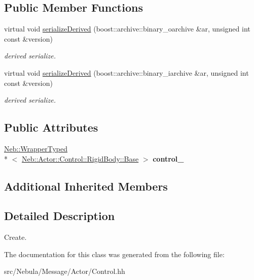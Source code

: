 \subsection*{Public Member Functions}
\begin{DoxyCompactItemize}
\item 
\hypertarget{classNeb_1_1Message_1_1Actor_1_1Control_1_1RigidBody_1_1Create_aa390bc059f2eea71aed8d255faf23509}{virtual void \hyperlink{classNeb_1_1Message_1_1Actor_1_1Control_1_1RigidBody_1_1Create_aa390bc059f2eea71aed8d255faf23509}{serialize\-Derived} (boost\-::archive\-::binary\-\_\-oarchive \&ar, unsigned int const \&version)}\label{classNeb_1_1Message_1_1Actor_1_1Control_1_1RigidBody_1_1Create_aa390bc059f2eea71aed8d255faf23509}

\begin{DoxyCompactList}\small\item\em derived serialize. \end{DoxyCompactList}\item 
\hypertarget{classNeb_1_1Message_1_1Actor_1_1Control_1_1RigidBody_1_1Create_a6784429360fa42e6146a696d7e164731}{virtual void \hyperlink{classNeb_1_1Message_1_1Actor_1_1Control_1_1RigidBody_1_1Create_a6784429360fa42e6146a696d7e164731}{serialize\-Derived} (boost\-::archive\-::binary\-\_\-iarchive \&ar, unsigned int const \&version)}\label{classNeb_1_1Message_1_1Actor_1_1Control_1_1RigidBody_1_1Create_a6784429360fa42e6146a696d7e164731}

\begin{DoxyCompactList}\small\item\em derived serialize. \end{DoxyCompactList}\end{DoxyCompactItemize}
\subsection*{Public Attributes}
\begin{DoxyCompactItemize}
\item 
\hypertarget{classNeb_1_1Message_1_1Actor_1_1Control_1_1RigidBody_1_1Create_ad5dad4e62045e21146c253792c0c36ee}{\hyperlink{classNeb_1_1WrapperTyped}{Neb\-::\-Wrapper\-Typed}\\*
$<$ \hyperlink{classNeb_1_1Actor_1_1Control_1_1RigidBody_1_1Base}{Neb\-::\-Actor\-::\-Control\-::\-Rigid\-Body\-::\-Base} $>$ {\bfseries control\-\_\-}}\label{classNeb_1_1Message_1_1Actor_1_1Control_1_1RigidBody_1_1Create_ad5dad4e62045e21146c253792c0c36ee}

\end{DoxyCompactItemize}
\subsection*{Additional Inherited Members}


\subsection{Detailed Description}
Create. 

The documentation for this class was generated from the following file\-:\begin{DoxyCompactItemize}
\item 
src/\-Nebula/\-Message/\-Actor/Control.\-hh\end{DoxyCompactItemize}
